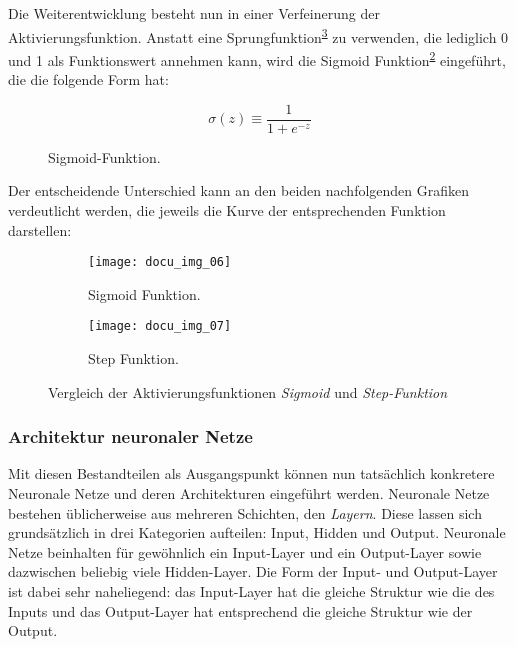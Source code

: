Die Weiterentwicklung besteht nun in einer Verfeinerung der Aktivierungsfunktion. Anstatt eine Sprungfunktion\textsuperscript{\ref{fig:step-function}} zu verwenden, die lediglich 0 und 1 als Funktionswert annehmen kann, wird die Sigmoid Funktion\textsuperscript{\ref{fig:sigmoid-function}} eingeführt, die die folgende Form hat:

\begin{figure}[H]
    \centering
    \[ \sigma(z) \equiv
          \frac{1}{1+e^{-z}}
    \]
    \caption{Sigmoid-Funktion.}
    \label{fig:sigmoid}
\end{figure}

Der entscheidende Unterschied kann an den beiden nachfolgenden Grafiken verdeutlicht werden, die jeweils die Kurve der entsprechenden Funktion darstellen:

\captionsetup[subfigure]{labelformat=empty, labelsep=none}
\begin{figure}[H]
    \centering
    \begin{subfigure}{0.45\textwidth}
		\texttt{[image: docu\_img\_06]}
		\caption{\tiny{Sigmoid Funktion.}}
		\label{fig:sigmoid-function}
	\end{subfigure}
    \begin{subfigure}{0.45\textwidth}
		\texttt{[image: docu\_img\_07]}
		\caption{\tiny{Step Funktion.}}
		\label{fig:step-function}
	\end{subfigure}

    \caption{Vergleich der Aktivierungsfunktionen \textit{Sigmoid} und \textit{Step-Funktion}}
    \label{fig:activation-functions}
\end{figure}

\subsubsection{Architektur neuronaler Netze}

Mit diesen Bestandteilen als Ausgangspunkt können nun tatsächlich konkretere Neuronale Netze und deren Architekturen eingeführt werden. Neuronale Netze bestehen üblicherweise aus mehreren Schichten, den \textit{Layern}. Diese lassen sich grundsätzlich in drei Kategorien aufteilen: Input, Hidden und Output. Neuronale Netze beinhalten für gewöhnlich ein Input-Layer und ein Output-Layer sowie dazwischen beliebig viele Hidden-Layer. Die Form der Input- und Output-Layer ist dabei sehr naheliegend: das Input-Layer hat die gleiche Struktur wie die des Inputs und das Output-Layer hat entsprechend die gleiche Struktur wie der Output.


